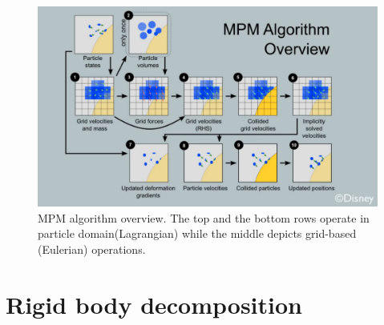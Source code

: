 \begin{itemize}
\begin{figure}[h!]
\centering
\includegraphics[width=\textwidth]{img/MPM}
\caption{MPM algorithm overview. The top and the bottom rows operate in particle domain(Lagrangian) while the middle depicts grid-based (Eulerian) operations. \cite{disney}
}
\label{mpm}
\end{figure}

\section{Rigid body decomposition}


\end{itemize}
